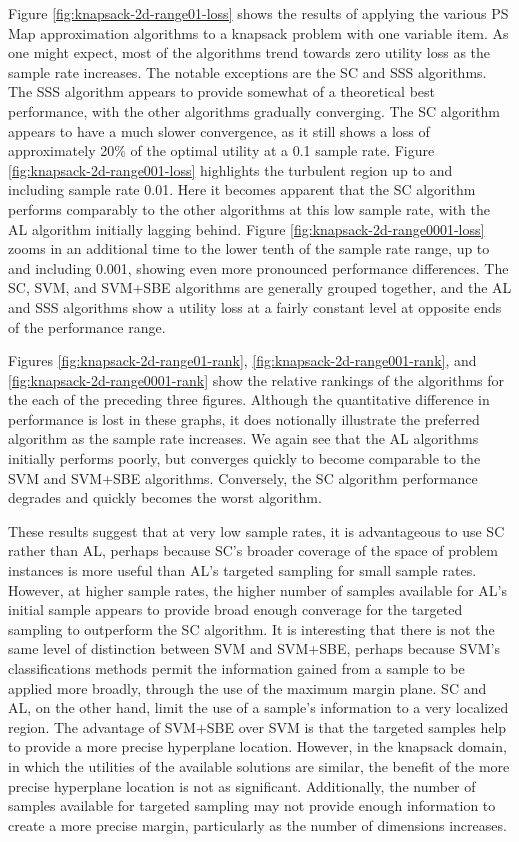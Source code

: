 Figure \ref{fig:knapsack-2d-range01-loss} shows the results of applying the various PS Map approximation algorithms to a knapsack problem with one variable item.  As one might expect, most of the algorithms trend towards zero utility loss as the sample rate increases.  The notable exceptions are the SC and SSS algorithms. The SSS algorithm appears to provide somewhat of a theoretical best performance, with the other algorithms gradually converging.  The SC algorithm appears to have a much slower convergence, as it still shows a loss of approximately 20\% of the optimal utility at a 0.1 sample rate.  Figure \ref{fig:knapsack-2d-range001-loss} highlights the turbulent region up to and including sample rate 0.01.  Here it becomes apparent that the SC algorithm performs comparably to the other algorithms at this low sample rate, with the AL algorithm initially lagging behind.  Figure \ref{fig:knapsack-2d-range0001-loss} zooms in an additional time to the lower tenth of the sample rate range, up to and including 0.001, showing even more pronounced performance differences.  The SC, SVM, and SVM+SBE algorithms are generally grouped together, and the AL and SSS algorithms show a utility loss at a fairly constant level at opposite ends of the performance range.

Figures \ref{fig:knapsack-2d-range01-rank}, \ref{fig:knapsack-2d-range001-rank}, and \ref{fig:knapsack-2d-range0001-rank} show the relative rankings of the algorithms for the each of the preceding three figures.  Although the quantitative difference in performance is lost in these graphs, it does notionally illustrate the preferred algorithm as the sample rate increases.  We again see that the AL algorithms initially performs poorly, but converges quickly to become comparable to the SVM and SVM+SBE algorithms.  Conversely, the SC algorithm performance degrades and quickly becomes the worst algorithm. 

These results suggest that at very low sample rates, it is advantageous to use SC rather than AL, perhaps because SC's broader coverage of the space of problem instances is more useful than AL's targeted sampling for small sample rates.  However, at higher sample rates, the higher number of samples available for AL's initial sample appears to provide broad enough converage for the targeted sampling  to outperform the SC algorithm.  It is interesting that there is not the same level of distinction between SVM and SVM+SBE, perhaps because SVM's classifications methods permit the information gained from a sample to be applied more broadly, through the use of the maximum margin plane.  SC and AL, on the other hand, limit the use of a sample's information to a very localized region.  The advantage of SVM+SBE over SVM is that the targeted samples help to provide a more precise hyperplane location.  However, in the knapsack domain, in which the utilities of the available solutions are similar,  the benefit of the more precise hyperplane location is not as significant.  Additionally, the number of samples available for targeted sampling may not provide enough information to create a more precise margin, particularly as the number of dimensions increases.



